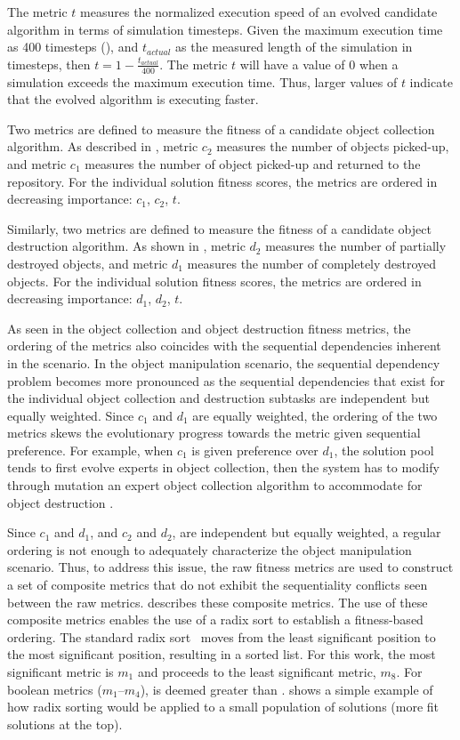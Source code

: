 The metric $t$ measures the normalized execution speed of an evolved candidate algorithm in terms of simulation timesteps.  Given the maximum execution time as 400 timesteps (), and $t_{actual}$ as the measured length of the simulation in timesteps, then $t=1-\frac{t_{actual}}{400}$.  The metric $t$ will have a value of 0 when a simulation exceeds the maximum execution time.  Thus, larger values of $t$ indicate that the evolved algorithm is executing faster.  

Two metrics are defined to measure the fitness of a candidate object collection algorithm.  As described in , metric $c_2$ measures the number of objects picked-up, and metric $c_1$ measures the number of object picked-up and returned to the repository.  For the individual solution fitness scores, the metrics are ordered in decreasing importance: $c_1$, $c_2$, $t$.

Similarly, two metrics are defined to measure the fitness of a candidate object destruction algorithm.  As shown in , metric $d_2$ measures the number of partially destroyed objects, and metric $d_1$ measures the number of completely destroyed objects.  For the individual solution fitness scores, the metrics are ordered in decreasing importance: $d_1$, $d_2$, $t$.  

As seen in the object collection and object destruction fitness metrics, the ordering of the metrics also coincides with the sequential dependencies inherent in the scenario.  In the object manipulation scenario, the sequential dependency problem becomes more pronounced as the sequential dependencies that exist for the individual object collection and destruction subtasks are independent but equally weighted.  Since $c_1$ and $d_1$ are equally weighted, the ordering of the two metrics skews the evolutionary progress towards the metric given sequential preference.  For example, when $c_1$ is given preference over $d_1$, the solution pool tends to first evolve experts in object collection, then the system has to modify through mutation an expert object collection algorithm to accommodate for object destruction \cite{kovacina:AdaptiveIntelligentEvolution}.

Since $c_1$ and $d_1$, and $c_2$ and $d_2$, are independent but equally weighted, a regular ordering is not enough to adequately characterize the object manipulation scenario.  Thus, to address this issue, the raw fitness metrics are used to construct a set of composite metrics that do not exhibit the sequentiality conflicts seen between the raw metrics.   describes these composite metrics.  The use of these composite metrics enables the use of a radix sort to establish a fitness-based ordering.  The standard radix sort~\cite{clr} moves from the least significant position to the most significant position, resulting in a sorted list.  For this work, the most significant metric is $m_1$ and proceeds to the least significant metric, $m_8$.  For boolean metrics ($m_1$--$m_4$), \true{} is deemed greater than \false{}.   shows a simple example of how radix sorting would be applied to a small population of solutions (more fit solutions at the top).

